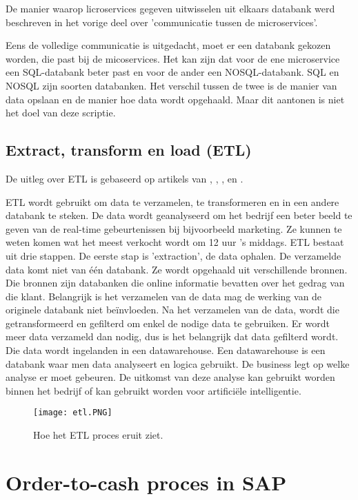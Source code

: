 De manier waarop licroservices gegeven uitwisselen uit elkaars databank werd beschreven in het vorige deel over 'communicatie tussen de microservices'.
 
Eens de volledige communicatie is uitgedacht, moet er een databank gekozen worden, die past bij de micoservices. Het kan zijn dat voor de ene microservice een SQL-databank beter past en voor de ander een NOSQL-databank. SQL en NOSQL zijn soorten databanken. Het verschil tussen de twee is de manier van data opslaan en de manier hoe data wordt opgehaald. Maar dit aantonen is niet het doel van deze scriptie.
 
\subsection{Extract, transform en load (ETL)}
De uitleg over ETL is gebaseerd op artikels van \textcite{Loshin2019}, \textcite{Alley2018}, \textcite{Stich2019}, \textcite{Guru2019} en \textcite{Naveen2016}.

ETL wordt gebruikt  om data te verzamelen, te transformeren en in een andere databank te steken. De data wordt geanalyseerd om het bedrijf een beter beeld te geven van de real-time gebeurtenissen bij bijvoorbeeld marketing. Ze kunnen te weten komen wat het meest verkocht wordt om 12 uur 's middags. 
ETL bestaat uit drie stappen.
De eerste stap is 'extraction', de data ophalen. De verzamelde data komt niet van één databank. Ze wordt opgehaald uit verschillende bronnen. Die bronnen zijn databanken die online informatie bevatten over het gedrag van die klant. Belangrijk is het verzamelen van de data mag de werking van de originele databank niet beïnvloeden.
Na het verzamelen van de data, wordt die getransformeerd en gefilterd om enkel de nodige data te gebruiken. Er wordt meer data verzameld dan nodig, dus is het belangrijk dat data gefilterd wordt.
Die data wordt ingelanden in een datawarehouse. Een datawarehouse is een databank waar men data analyseert en logica gebruikt. De business legt op welke analyse er moet gebeuren. De uitkomst van deze analyse kan gebruikt worden binnen het bedrijf of kan gebruikt worden voor artificiële intelligentie.  

\begin{figure}[h!]
	\texttt{[image: etl.PNG]}
	\centering
	\caption{Hoe het ETL proces eruit ziet. \textcite{Panolapy2019}}
\end{figure}


\section{Order-to-cash proces in SAP}
